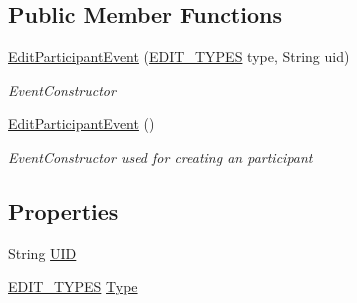 \subsection*{Public Member Functions}
\begin{DoxyCompactItemize}
\item 
\hyperlink{class_web_analyzer_1_1_events_1_1_edit_participant_event_a060c5e39919bd1efe735bd5fc9f7186a}{Edit\+Participant\+Event} (\hyperlink{class_web_analyzer_1_1_events_1_1_edit_participant_event_a72647511d8ac40197121e93d14913a1a}{E\+D\+I\+T\+\_\+\+T\+Y\+P\+E\+S} type, String uid)
\begin{DoxyCompactList}\small\item\em Event\+Constructor \end{DoxyCompactList}\item 
\hyperlink{class_web_analyzer_1_1_events_1_1_edit_participant_event_ab3be8191a9ca9f6037ae024fb4d21802}{Edit\+Participant\+Event} ()
\begin{DoxyCompactList}\small\item\em Event\+Constructor used for creating an participant \end{DoxyCompactList}\end{DoxyCompactItemize}
\subsection*{Properties}
\begin{DoxyCompactItemize}
\item 
String \hyperlink{class_web_analyzer_1_1_events_1_1_edit_participant_event_acef746eb86f5262d48b583822b20cfcc}{U\+I\+D}
\item 
\hyperlink{class_web_analyzer_1_1_events_1_1_edit_participant_event_a72647511d8ac40197121e93d14913a1a}{E\+D\+I\+T\+\_\+\+T\+Y\+P\+E\+S} \hyperlink{class_web_analyzer_1_1_events_1_1_edit_participant_event_a26e1781598d44a49a9512df5442eb4a6}{Type}
\end{DoxyCompactItemize}
